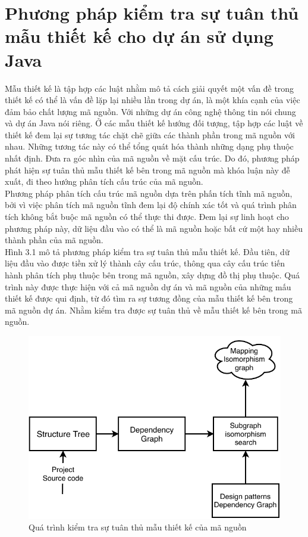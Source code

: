 \documentclass[12pt]{report}
\begin{document}
\chapter{Phương pháp kiểm tra sự tuân thủ mẫu thiết kế cho dự án sử dụng Java}
\newpage
Mẫu thiết kế là tập hợp các luật nhằm mô tả cách giải quyết một vấn đề trong thiết kế có thể là vấn đề lặp lại nhiều lần trong dự án, là một khía cạnh của việc đảm bảo chất lượng mã nguồn. Với những dự án công nghệ thông tin nói chung và dự án Java nói riêng. Ở các mẫu thiết kế hướng đối tượng, tập hợp các luật về thiết kế đem lại sự tương tác chặt chẽ giữa các thành phần trong mã nguồn với nhau. Những tương tác này có thể tổng quát hóa thành những dạng phụ thuộc nhất định. Đưa ra góc nhìn của mã nguồn về mặt cấu trúc. Do đó, phương pháp phát hiện sự tuân thủ mẫu thiết kế bên trong mã nguồn mà khóa luận này đễ xuất, đi theo hướng phân tích cấu trúc của mã nguồn.\\
Phương pháp phân tích cấu trúc mã nguồn dựa trên phấn tích tĩnh mã nguồn, bởi vì việc phân tích mã nguồn tĩnh đem lại độ chính xác tốt và quá trình phân tích không bắt buộc mã nguồn có thể thực thi được. Đem lại sự linh hoạt cho phương pháp này, dữ liệu đầu vào có thể là mã nguồn hoặc bất cứ một hay nhiều thành phần của mã nguồn.\\
Hình 3.1 mô tả phương pháp kiểm tra sự tuân thủ mẫu thiết kế. Đầu tiên, dữ liệu đầu vào được tiền xử lý thành cây cấu trúc, thông qua cây cấu trúc tiến hành phân tích phụ thuộc bên trong mã nguồn, xây dựng đồ thị phụ thuộc. Quá trình này được thực hiện với cả mã nguồn dự án và mã nguồn của những mấu thiết kế được qui định, từ đó tìm ra sự tương đồng của mẫu thiết kế bên trong mã nguồn dự án. Nhằm kiểm tra được sự tuân thủ về mẫu thiết kế bên trong mã nguồn.
\begin{figure}[h]
	\centering
	\includegraphics[scale=0.36]{images/general_architecture_3_1}
	\caption{Quá trình kiểm tra sự tuân thủ mẫu thiết kế của mã nguồn}
	\label{fig:general_architecture}
\end{figure}
\end{document}
